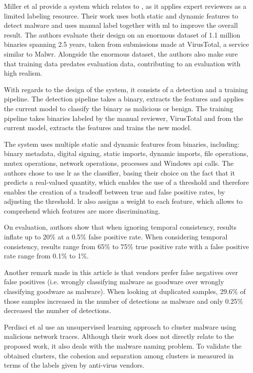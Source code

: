 Miller et al\cite{miller:rev_int} provide a system which relates to \cite{nissim:al_pdf}, as it applies expert reviewers as a limited labeling resource. Their work uses both static and dynamic features to detect malware and uses manual label together with \gls{ml} to improve the overall result. The authors evaluate their design on an enormous dataset of 1.1 million binaries spanning 2.5 years, taken from submissions made at VirusTotal, a service similar to Malwr. Alongside the enormous dataset, the authors also make sure that training data predates evaluation data, contributing to an evaluation with high realism.

With regards to the design of the system, it consists of a detection and a training pipeline. The detection pipeline takes a binary, extracts the features and applies the current model to classify the binary as malicious or benign. The training pipeline takes binaries labeled by the manual reviewer, VirusTotal and from the current model, extracts the features and trains the new model.

The system uses multiple static and dynamic features from binaries, including: binary metadata, digital signing, static imports, dynamic imports, file operations, mutex operations, network operations, processes and Windows \gls{api} calls. The authors chose to use \gls{lr} as the classifier, basing their choice on the fact that it predicts a real-valued quantity, which enables the use of a threshold and therefore enables the creation of a tradeoff between true and false positive rates, by adjusting the threshold. \gls{lr} also assigns a weight to each feature, which allows to comprehend which features are more discriminating.

On evaluation, authors show that when ignoring temporal consistency, results inflate up to 20\% at a 0.5\% false positive rate. When considering temporal consistency, results range from 65\% to 75\% true positive rate with a false positive rate range from 0.1\% to 1\%.

Another remark made in this article is that vendors prefer false negatives over false positives (i.e. wrongly classifying malware as goodware over wrongly classifying goodware as malware). When looking at duplicated samples, 29.6\% of those samples increased in the number of detections as malware and only 0.25\% decreased the number of detections.

Perdisci et al\cite{perdisci:behavior} use an unsupervised learning approach to cluster malware using malicious network traces. Although their work does not directly relate to the proposed work, it also deals with the malware naming problem. To validate the obtained clusters, the cohesion and separation among clusters is measured in terms of the labels given by anti-virus vendors.

